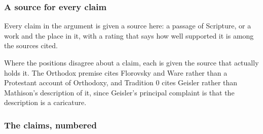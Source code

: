 \documentclass[11pt]{article}
\begin{document}
\subsubsection*{A source for every claim}
Every claim in the argument is given a source here: a passage of Scripture, or a work and the place in it, with a rating that says how well supported it is among the sources cited.

Where the positions disagree about a claim, each is given the source that actually holds it. The Orthodox premise cites Florovsky and Ware rather than a Protestant account of Orthodoxy, and Tradition 0 cites Geisler rather than Mathison’s description of it, since Geisler’s principal complaint is that the description is a caricature.

\subsubsection*{The claims, numbered}
\end{document}

